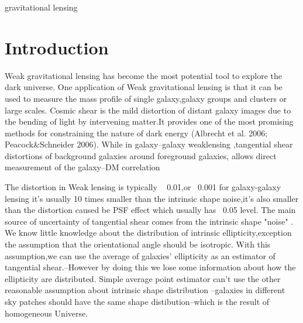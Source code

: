 \documentclass[useAMS,usenatbib]{mn2e}
\begin{document}
\begin{keywords}
  gravitational lensing
\end{keywords}

\setcounter{footnote}{1}


\section{Introduction}
\label{sec:intro}







Weak gravitational lensing has become the most potential tool to explore the dark universe. 
One application of Weak gravitational lensing is that it can be used to measure the mass profile of single galaxy,galaxy groups and clusters or large scales.
Cosmic shear is the mild distortion of distant galaxy images due to the bending of light by intervening matter.It provides one of the most promising methods for constraining the nature of dark energy (Albrecht et al. 2006; Peacock&Schneider 2006). 
While in galaxy--galaxy weaklensing ,tangential shear distortions of background galaxies around foreground galaxies, allows direct measurement of the galaxy–DM correlation




The distortion in Weak lensing is typically ~ 0.01,or ~0.001 for galaxy-galaxy lensing  it's usually 10 times smaller than the intrinsic shape 
noise,it's also smaller than the distortion caused be PSF effect which usually has ~0.05 level.
The main source of uncertainty of tangential shear comes from the intrinsic shape "noise" . We know little knowledge about 
the distribution of intrinsic ellipticity,exception the assumption that the orientational angle should be isotropic.
With this assumption,we can use the average of galaxies' ellipticity as an estimator of tangential shear.--However by 
doing this we lose some information about how the ellipticity are distributed. Simple average point estimator can't 
use the other reasonable assumption about intrinsic shape distribution --galaxies in different sky patches should have 
the same shape distibution--which is the result of homogeneous Universe.
\end{document}
